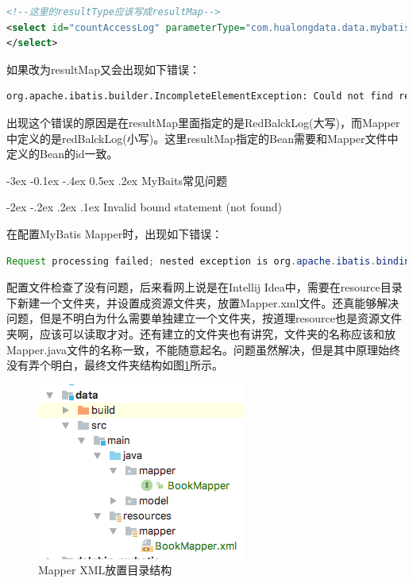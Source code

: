 \documentclass[12pt]{book}
\makeatletter
\numberwithin{dummy}{section}
\theoremstyle{ocrenumbox}
\theoremstyle{blacknumex}
\theoremstyle{blacknumbox}
\theoremstyle{ocrenum}
\renewcommand{\subsection}{\@startsection {subsection}{2}{\z@}
	{-3ex \@plus -0.1ex \@minus -.4ex}
	{0.5ex \@plus.2ex }
	{\normalfont\sffamily\bfseries}}
\renewcommand\paragraph{\@startsection{paragraph}{4}{\z@}
	{-2ex \@plus-.2ex \@minus .2ex}
	{.1ex}
	{\normalfont\small\sffamily\bfseries}}
\makeatother
\begin{document}
\begin{lstlisting}[language=XML]
<!--这里的resultType应该写成resultMap-->
<select id="countAccessLog" parameterType="com.hualongdata.data.mybatis.Pageable" resultType="AccessLog">
</select>
\end{lstlisting}

如果改为resultMap又会出现如下错误：


\begin{lstlisting}[language=XML]
org.apache.ibatis.builder.IncompleteElementException: Could not find result map creditsystem.data.mapper.RedBalckLogMapper.RedBalckLog
\end{lstlisting}

出现这个错误的原因是在resultMap里面指定的是RedBalckLog(大写)，而Mapper中定义的是redBalckLog(小写)。这里resultMap指定的Bean需要和Mapper文件中定义的Bean的id一致。

\subsection{MyBaits常见问题}

\paragraph{Invalid bound statement (not found)}

在配置MyBatis Mapper时，出现如下错误：

\begin{lstlisting}[language=Java]
Request processing failed; nested exception is org.apache.ibatis.binding.BindingException: Invalid bound statement (not found)
\end{lstlisting}

配置文件检查了没有问题，后来看网上说是在Intellij Idea中，需要在resource目录下新建一个文件夹，并设置成资源文件夹，放置Mapper.xml文件。还真能够解决问题，但是不明白为什么需要单独建立一个文件夹，按道理resource也是资源文件夹啊，应该可以读取才对。还有建立的文件夹也有讲究，文件夹的名称应该和放Mapper.java文件的名称一致，不能随意起名。问题虽然解决，但是其中原理始终没有弄个明白，最终文件夹结构如图\ref{fig:mapperreourcestructure}所示。

\begin{figure}[htbp]
	\centering
	\includegraphics[scale=0.7]{mapperreourcestructure.png}
	\caption{Mapper XML放置目录结构}
	\label{fig:mapperreourcestructure}
\end{figure}
\end{document}

